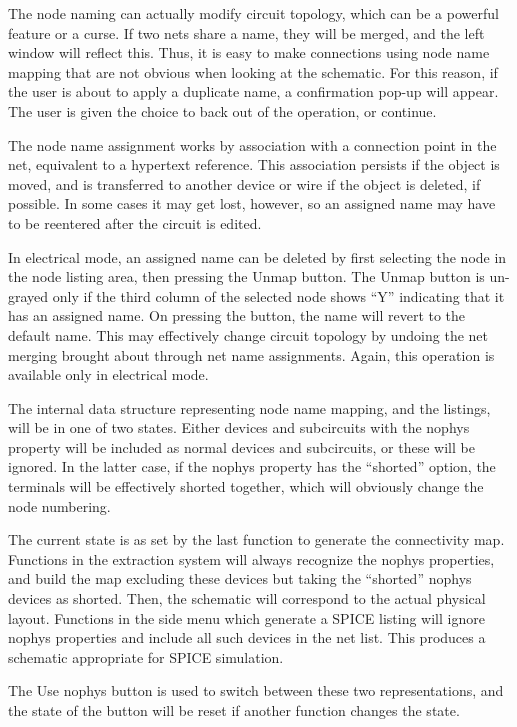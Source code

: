 The node naming can actually modify circuit topology, which can be a
powerful feature or a curse.  If two nets share a name, they will be
merged, and the left window will reflect this.  Thus, it is easy to
make connections using node name mapping that are not obvious when
looking at the schematic.  For this reason, if the user is about to
apply a duplicate name, a confirmation pop-up will appear.  The user
is given the choice to back out of the operation, or continue.

The node name assignment works by association with a connection point
in the net, equivalent to a hypertext reference.  This association
persists if the object is moved, and is transferred to another device
or wire if the object is deleted, if possible.  In some cases it may
get lost, however, so an assigned name may have to be reentered after
the circuit is edited.

In electrical mode, an assigned name can be deleted by first selecting
the node in the node listing area, then pressing the {\cb Unmap}
button.  The {\cb Unmap} button is un-grayed only if the third column
of the selected node shows ``{\vt Y}'' indicating that it has an
assigned name.  On pressing the button, the name will revert to the
default name.  This may effectively change circuit topology by undoing
the net merging brought about through net name assignments.  Again,
this operation is available only in electrical mode.

The internal data structure representing node name mapping, and the
listings, will be in one of two states.  Either devices and
subcircuits with the {\et nophys} property will be included as normal
devices and subcircuits, or these will be ignored.  In the latter
case, if the {\et nophys} property has the ``shorted'' option, the
terminals will be effectively shorted together, which will obviously
change the node numbering.

The current state is as set by the last function to generate the
connectivity map.  Functions in the extraction system will always
recognize the {\cb nophys} properties, and build the map excluding
these devices but taking the ``shorted'' {\et nophys} devices as
shorted.  Then, the schematic will correspond to the actual physical
layout.  Functions in the side menu which generate a SPICE listing
will ignore {\et nophys} properties and include all such devices in
the net list.  This produces a schematic appropriate for SPICE
simulation.

The {\cb Use nophys} button is used to switch between these two
representations, and the state of the button will be reset if another
function changes the state.

